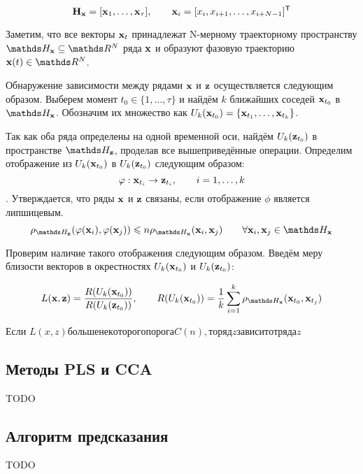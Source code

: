 \documentclass[a4paper]{article}
\begin{document}
\begin{equation*} \label{eq:traj_mat_short}
	\mathbf{H}_{\mathbf{x}} = [\mathbf{x}_1, \ldots, \mathbf{x}_{\tau}], \qquad \mathbf{x}_i = [x_i, x_{i+1}, \ldots, x_{i+N-1}]^{\mathsf{T}} 
\end{equation*}

Заметим, что все векторы $\mathbf{x}_t$ принадлежат N-мерному траекторному пространству $\dH_{\bx} \subseteq \dR^N$ ряда $\mathbf{x}$ и образуют фазовую траекторию $\bx(t) \in \dR^N$.

Обнаружение зависимости между рядами $\mathbf{x}$ и $\mathbf{z}$ осуществляется следующим образом. Выберем момент $t_0 \in \{ 1, \ldots, \tau\}$ и найдём $k$ ближайших соседей $\mathbf{x}_{t_0}$ в $\dH_{\bx}$. Обозначим их множество как $U_k(\mathbf{x}_{t_0}) = \{ \mathbf{x}_{t_1}, \ldots, \mathbf{x}_{t_k} \}$. 

Так как оба ряда определены на одной временной оси, найдём $U_k(\mathbf{z}_{t_0})$ в пространстве $\dH_{\bz}$, проделав все вышеприведённые операции. Определим отображение из $U_k(\mathbf{x}_{t_0})$ в $U_k(\mathbf{z}_{t_0})$ следующим образом: 
$$ \varphi: \mathbf{x}_{t_i} \rightarrow \mathbf{z}_{t_i}, \qquad i = 1, \ldots, k$$.
Утверждается, что ряды $\mathbf{x}$ и $\mathbf{z}$ связаны, если отображение $\phi$ является липшицевым.
$$ \rho_{\dH_{\bz}}(\phi(\bx_i), \phi(\bx_j)) \leq n \rho_{\dH_{\bx}}(\bx_i, \bx_j) \qquad \forall \bx_i, \bx_j \in \dH_{\bx}$$

Проверим наличие такого отображения следующим образом. Введём меру близости векторов в окрестностях $U_k(\mathbf{x}_{t_0})$ и $U_k(\mathbf{z}_{t_0})$:

\begin{equation}
	L(\bx, \bz) = \dfrac{R(U_k(\bx_{t_0}))}{R(U_k(\bz_{t_0}))}, \qquad R(U_k(\bx_{t_0})) = \dfrac{1}{k} \sum\limits_{i=1}^k \rho_{\dH_{\bx}}(\bx_{t_0}, \bx_{t_j})
\end{equation}

Если $L(x, z) больше некоторого порога C(n), то ряд z зависит от ряда z$


\subsection{Методы PLS и CCA}
TODO

\subsection{Алгоритм предсказания}
TODO



\end{document}
